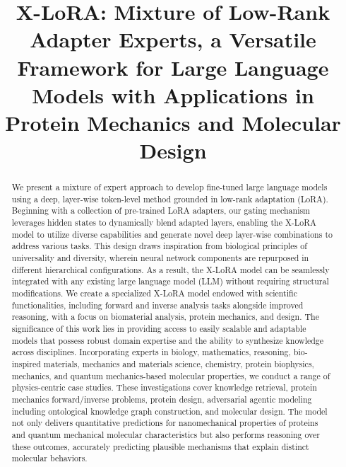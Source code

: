 \title{X-LoRA: Mixture of Low-Rank Adapter Experts, a Versatile Framework for Large Language Models with Applications in Protein Mechanics and Molecular Design}

\begin{abstract}
We present a mixture of expert approach to develop fine-tuned large language models using a deep, layer-wise token-level method grounded in low-rank adaptation (LoRA). Beginning with a collection of pre-trained LoRA adapters, our gating mechanism leverages hidden states to dynamically blend adapted layers, enabling the X-LoRA model to utilize diverse capabilities and generate novel deep layer-wise combinations to address various tasks. This design draws inspiration from biological principles of universality and diversity, wherein neural network components are repurposed in different hierarchical configurations. As a result, the X-LoRA model can be seamlessly integrated with any existing large language model (LLM) without requiring structural modifications. We create a specialized X-LoRA model endowed with scientific functionalities, including forward and inverse analysis tasks alongside improved reasoning, with a focus on biomaterial analysis, protein mechanics, and design. The significance of this work lies in providing access to easily scalable and adaptable models that possess robust domain expertise and the ability to synthesize knowledge across disciplines. Incorporating experts in biology, mathematics, reasoning, bio-inspired materials, mechanics and materials science, chemistry, protein biophysics, mechanics, and quantum mechanics-based molecular properties, we conduct a range of physics-centric case studies. These investigations cover knowledge retrieval, protein mechanics forward/inverse problems, protein design, adversarial agentic modeling including ontological knowledge graph construction, and molecular design. The model not only delivers quantitative predictions for nanomechanical properties of proteins and quantum mechanical molecular characteristics but also performs reasoning over these outcomes, accurately predicting plausible mechanisms that explain distinct molecular behaviors.
\end{abstract}

